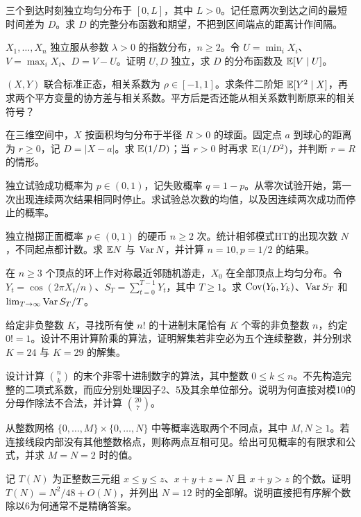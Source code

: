 三个到达时刻独立均匀分布于 $[0,L]$，其中 $L>0$。记任意两次到达之间的最短时间差为 $D$。求 $D$ 的完整分布函数和期望，不把到区间端点的距离计作间隔。

$X_1,\ldots,X_n$ 独立服从参数 $\lambda>0$ 的指数分布，$n\ge2$。令 $U=\min_iX_i$、$V=\max_iX_i$、$D=V-U$。证明 $U,D$ 独立，求 $D$ 的分布函数及 $\mathbb{E}[V\mid U]$。

$(X,Y)$ 联合标准正态，相关系数为 $\rho\in[-1,1]$。求条件二阶矩 $\mathbb{E}[Y^2\mid X]$，再求两个平方变量的协方差与相关系数。平方后是否还能从相关系数判断原来的相关符号？

在三维空间中，$X$ 按面积均匀分布于半径 $R>0$ 的球面。固定点 $a$ 到球心的距离为 $r\ge0$，记 $D=|X-a|$。求 $\mathbb{E}(1/D)$；当 $r>0$ 时再求 $\mathbb{E}(1/D^2)$，并判断 $r=R$ 的情形。

独立试验成功概率为 $p\in(0,1)$，记失败概率 $q=1-p$。从零次试验开始，第一次出现连续两次结果相同时停止。求试验总次数的均值，以及因连续两次成功而停止的概率。

独立抛掷正面概率 $p\in(0,1)$ 的硬币 $n\ge2$ 次。统计相邻模式HT的出现次数 $N$，不同起点都计数。求 $\mathbb{E} N$ 与 $\operatorname{Var} N$，并计算 $n=10,p=1/2$ 的结果。

在 $n\ge3$ 个顶点的环上作对称最近邻随机游走，$X_0$ 在全部顶点上均匀分布。令 $Y_t=\cos(2\pi X_t/n)$、$S_T=\sum_{t=0}^{T-1}Y_t$，其中 $T\ge1$。求 $\operatorname{Cov}(Y_0,Y_k)$、$\operatorname{Var} S_T$ 和 $\lim_{T\to\infty}\operatorname{Var} S_T/T$。

给定非负整数 $K$，寻找所有使 $n!$ 的十进制末尾恰有 $K$ 个零的非负整数 $n$，约定 $0!=1$。设计不用计算阶乘的算法，证明解集若非空必为五个连续整数，并分别求 $K=24$ 与 $K=29$ 的解集。

设计计算 $\binom nk$ 的末个非零十进制数字的算法，其中整数 $0\le k\le n$。不先构造完整的二项式系数，而应分别处理因子2、5及其余单位部分。说明为何直接对模10的分母作除法不合法，并计算 $\binom{20}{7}$。

从整数网格 $\{0,\ldots,M\}\times\{0,\ldots,N\}$ 中等概率选取两个不同点，其中 $M,N\ge1$。若连接线段内部没有其他整数格点，则称两点互相可见。给出可见概率的有限求和公式，并求 $M=N=2$ 时的值。

记 $T(N)$ 为正整数三元组 $x\le y\le z$、$x+y+z=N$ 且 $x+y>z$ 的个数。证明 $T(N)=N^2/48+O(N)$，并列出 $N=12$ 时的全部解。说明直接把有序解个数除以6为何通常不是精确答案。

